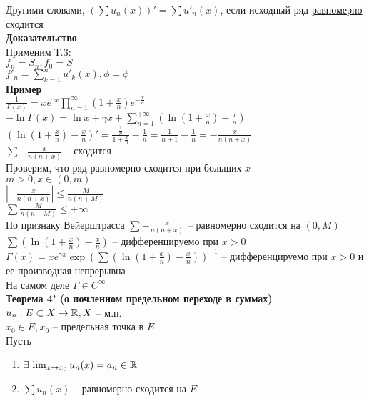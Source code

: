 \documentclass[12pt]{article}
\begin{document}
Другими словами, $(\sum u_n(x))' = \sum u'_n(x)$, если исходный ряд \underline{равномерно сходится}\\
\textbf{Доказательство}\\
Применим Т.3:\\
$f_n = S_n, f_0 = S$\\
$f'_n=\sum_{k=1}^n u'_k(x), \phi=\phi$\\
\textbf{Пример}\\
$\frac1{\Gamma(x)} = xe^{\gamma x}\prod_{n=1}^{\infty} (1+\frac xn)e^{-\frac xn}$\\
$-\ln \Gamma(x) = \ln x + \gamma x + \sum_{n=1}^{+\infty} (\ln (1+\frac xn)-\frac xn)$\\
$(\ln (1+\frac xn)-\frac xn)' = \frac{\frac1n}{1+\frac xn}-\frac1n = \frac1{n+1}-\frac1n = -\frac{x}{n(n+x)}$\\
$\sum -\frac{x}{n(n+x)}$ -- сходится\\
Проверим, что ряд равномерно сходится при больших $x$\\
$m>0, x \in (0, m)$\\
$|-\frac{x}{n(n+x)}| \leq \frac{M}{n(n+M)}$\\
$\sum \frac{M}{n(n+M)} \leq +\infty$\\
По признаку Вейерштрасса $\sum -\frac{x}{n(n+x)}$ -- равномерно сходится на $(0, M)$\\
$\sum (\ln (1+\frac xn)-\frac xn)$ -- дифференцируемо при $x>0$\\
$\Gamma(x) = xe^{\gamma x}\exp(\sum (\ln (1+\frac xn)-\frac xn))^{-1}$ -- дифференцируемо при $x>0$ и ее производная непрерывна\\
На самом деле $\Gamma \in C^\infty$\\
\textbf{Теорема 4' (о почленном предельном переходе в суммах)}\\
$u_n: E \subset X \rightarrow \mathbb{R}, X$ -- м.п.\\
$x_0 \in E, x_0$ -- предельная точка в $E$\\
Пусть \begin{enumerate}
    \item $\exists\, \lim_{x\rightarrow x_0} u_n(x) = a_n \in \mathbb{R}$
    \item $\sum u_n(x)$ -- равномерно сходится на $E$
\end{enumerate}
\end{document}
